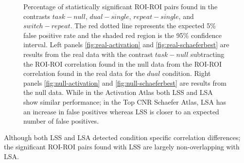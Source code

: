 \documentclass[10pt,letterpaper]{article}
\begin{document}
\begin{figure}[H]
  \centering
  \hfill
  \vfill
  \hfill
  \caption{
    Percentage of statistically significant ROI-ROI pairs found
    in the contrasts $task - null$, $dual - single$, $repeat - single$, and
    $switch - repeat$.
    The red dotted line represents the expected 5\% false positive rate
    and the shaded red region is the 95\% confidence interval.
    Left panels \ref{fig:real-activation} and \ref{fig:real-schaeferbest}
    are results from the real data with the contrast $task - null$ subtracting the
    ROI-ROI correlation found in the null data from the ROI-ROI correlation found in the
    real data for the $dual$ condition.
    Right panels \ref{fig:null-activation} and \ref{fig:null-schaeferbest} are results
    from the null data.
    While in the Activation Atlas both LSS and LSA show similar performance;
    in the Top CNR Schaefer Atlas, LSA has an increase in false positives
    whereas LSS is closer to an expected number of false positives.
  }
\label{fig:main-result}
\end{figure}

Although both LSS and LSA detected condition specific correlation differences;
the significant ROI-ROI pairs found with LSS are largely non-overlapping with LSA.
\end{document}
